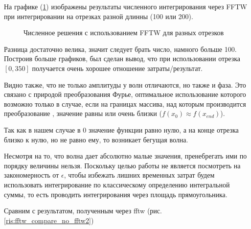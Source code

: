 \documentclass[%
bachelor,    %
natbib,      %
subf,        %
href,        %
colorlinks,  %
]{disser}
\begin{document}
На графике (\ref{ris:fftw_compare}) изображены результаты численного интегрирования через FFTW при интегрировании на отрезках разной длинны (100 или 200). 

\begin{figure}[h]
	\caption{Численное решения с использованием FFTW для разных отрезков}
	\label{ris:fftw_compare}
\end{figure}

Разница достаточно велика, значит следует брать число, намного больше 100. Построив больше графиков, был сделан вывод, что при использовании отрезка $[0, 350]$ получается очень хорошее отношение затраты/результат.

Видно также, что не только амплитуды у волн отличаются, но также и фаза. Это связано с природой преобразования Фурье, оптимальное использование которого возможно только в случае, если на границах массива, над которым производится преобразование , значение равны или очень близки ($f(x_0) \approx f(x_{end})$).

Так как в нашем случае в 0 значение функции равно нулю, а на конце отрезка близко к нулю, но не равно ему, то возникает бегущая волна.

Несмотря на то, что волна дает абсолютно малые значения, пренебрегать ими по порядку величины нельзя. Поскольку целью работы не является посмотреть на закономерность от $\epsilon$, чтобы избежать лишних временных затрат будем использовать интегрирование по классическому определению интегральной суммы, то есть проводить интегрирования через площадь прямоугольника.\cite{nrc}

Сравним с результатом, полученным через fftw (рис. \ref{ris:fftw_compare_no_fftw2})
\end{document}
